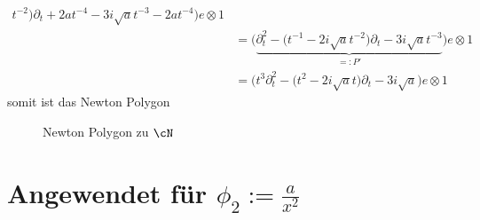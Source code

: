 \begin{try}
\begin{align*}
    t^{-2}\big)\partial_t
   + 2at^{-4} - 3i\sqrt{a} t^{-3}
   - 2a t^{-4}\Big) e\otimes 1
\\&= \Big( \underset{=:P'}{\underbrace{ \partial_t^2 - \big(t^{-1} - 2i\sqrt{a}
  t^{-2}\big)\partial_t - 3i\sqrt{a} t^{-3} }} \Big) e\otimes 1
\\&= \Big(t^3\partial_t^2 - \big(t^{2} - 2i\sqrt{a} t\big)\partial_t
   - 3i\sqrt{a} \Big) e\otimes 1
\end{align*}
somit ist das Newton Polygon
\begin{figure}[H]
\caption{Newton Polygon zu $\cN$}
\begin{center}
\end{center}
\end{figure}
\end{try}

\section{Angewendet für $\phi_2:=\frac{a}{x^2}$}
\begin{comment}
für $q=2$
%
\begin{align*}
P_{\phi}(x,\partial_x) &=(-x^2\partial_x)^2 (x\partial_x-1)+2a \\
  &=x^2\underbracket{\partial_xx^2}\partial_x(x\partial_x-1)+2a \\
  &=x^2\overbracket{(x^2\partial_x+2x)}\partial_x(x\partial_x-1)+2a \\
  &=(x^4\partial_x^2+2x^3\partial_x)(x\partial_x-1)+2a \\
  &=x^4\underbracket{\partial_x^2x}\partial_x
    +2x^3\underbracket{\partial_xx}\partial_x
    -x^4\partial_x^2-2x^3\partial_x+2a \\
  &=x^4\overbracket{(x\partial_x^2+2x)}\partial_x
    +2x^3\overbracket{(x\partial_x+1)}\partial_x
    -x^4\partial_x^2-2x^3\partial_x+2a \\
  &=x^5\partial_x^3+2x^5\partial_x +2x^4\partial_x^2 +2x^3\partial_x
    -x^4\partial_x^2-2x^3\partial_x+2a \\
  &=3x^5\partial_x^3 +x^4\partial_x^2 + 2a
\end{align*}
\end{comment}


